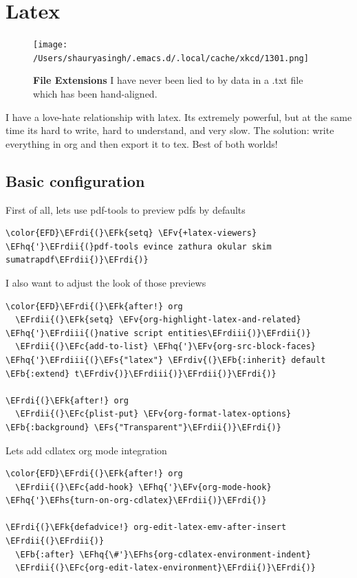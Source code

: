 \documentclass{scrartcl}
\newcommand{\EFk}[1]{\textcolor{EFk}{#1}} %
\newcommand{\EFs}[1]{\textcolor{EFs}{#1}} %
\newcommand{\EFb}[1]{\textcolor{EFb}{#1}} %
\newcommand{\EFc}[1]{\textcolor{EFc}{#1}} %
\newcommand{\EFv}[1]{\textcolor{EFv}{#1}} %
\newcommand{\EFhq}[1]{\textcolor{EFhq}{#1}} %
\newcommand{\EFhs}[1]{\textcolor{EFhs}{#1}} %
\newcommand{\EFrdi}[1]{\textcolor{EFrdi}{#1}} %
\newcommand{\EFrdii}[1]{\textcolor{EFrdii}{#1}} %
\newcommand{\EFrdiii}[1]{\textcolor{EFrdiii}{#1}} %
\newcommand{\EFrdiv}[1]{\textcolor{EFrdiv}{#1}} %
\begin{document}
\section{Latex}
\label{sec:orgedbf5b7}
\begin{figure}[!htb]
	  \centering
	  \texttt{[image: /Users/shauryasingh/.emacs.d/.local/cache/xkcd/1301.png]}
  \caption*{\label{xkcd:1301} \textbf{File Extensions} I have never been lied to by data in a .txt file which has been hand-aligned.}
	\end{figure}
I have a love-hate relationship with latex. Its extremely powerful, but at the
same time its hard to write, hard to understand, and very slow. The solution:
write everything in org and then export it to tex. Best of both worlds!

\subsection{Basic configuration}
\label{sec:orgc31fbe7}
First of all, lets use pdf-tools to preview pdfs by defaults
\begin{Code}
\begin{Verbatim}[]
\color{EFD}\EFrdi{(}\EFk{setq} \EFv{+latex-viewers} \EFhq{'}\EFrdii{(}pdf-tools evince zathura okular skim sumatrapdf\EFrdii{)}\EFrdi{)}
\end{Verbatim}
\end{Code}

I also want to adjust the look of those previews
\begin{Code}
\begin{Verbatim}[]
\color{EFD}\EFrdi{(}\EFk{after!} org
  \EFrdii{(}\EFk{setq} \EFv{org-highlight-latex-and-related} \EFhq{'}\EFrdiii{(}native script entities\EFrdiii{)}\EFrdii{)}
  \EFrdii{(}\EFc{add-to-list} \EFhq{'}\EFv{org-src-block-faces} \EFhq{'}\EFrdiii{(}\EFs{"latex"} \EFrdiv{(}\EFb{:inherit} default \EFb{:extend} t\EFrdiv{)}\EFrdiii{)}\EFrdii{)}\EFrdi{)}

\EFrdi{(}\EFk{after!} org
  \EFrdii{(}\EFc{plist-put} \EFv{org-format-latex-options} \EFb{:background} \EFs{"Transparent"}\EFrdii{)}\EFrdi{)}
\end{Verbatim}
\end{Code}

Lets add cdlatex org mode integration
\begin{Code}
\begin{Verbatim}[]
\color{EFD}\EFrdi{(}\EFk{after!} org
  \EFrdii{(}\EFc{add-hook} \EFhq{'}\EFv{org-mode-hook} \EFhq{'}\EFhs{turn-on-org-cdlatex}\EFrdii{)}\EFrdi{)}

\EFrdi{(}\EFk{defadvice!} org-edit-latex-emv-after-insert \EFrdii{(}\EFrdii{)}
  \EFb{:after} \EFhq{\#'}\EFhs{org-cdlatex-environment-indent}
  \EFrdii{(}\EFc{org-edit-latex-environment}\EFrdii{)}\EFrdi{)}
\end{Verbatim}
\end{Code}
\end{document}
